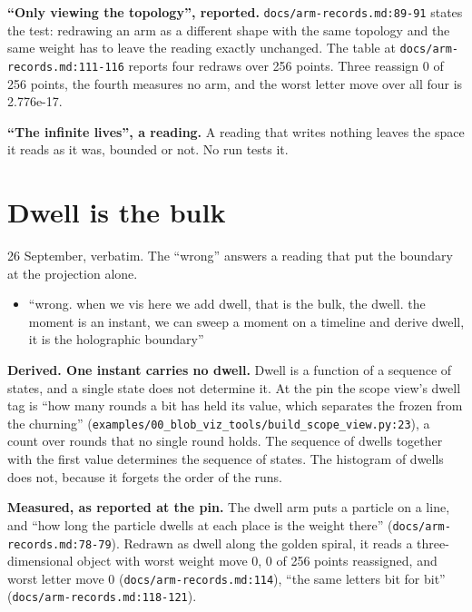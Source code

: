 \textbf{“Only viewing the topology”, reported.} \texttt{docs/\allowbreak{}arm-\allowbreak{}records.\allowbreak{}md:89-\allowbreak{}91} states the test: redrawing an arm as a different shape with the same topology and the same weight has to leave the reading exactly unchanged. The table at \texttt{docs/\allowbreak{}arm-\allowbreak{}records.\allowbreak{}md:111-\allowbreak{}116} reports four redraws over 256 points. Three reassign 0 of 256 points, the fourth measures no arm, and the worst letter move over all four is 2.776e-17.

\textbf{“The infinite lives”, a reading.} A reading that writes nothing leaves the space it reads as it was, bounded or not. No run tests it.

\section{\texorpdfstring{Dwell is the bulk}{Dwell is the bulk}}

26 September, verbatim. The “wrong” answers a reading that put the boundary at the projection alone.

\begin{itemize}
\item “wrong. when we vis here we add dwell, that is the bulk, the dwell. the moment is an instant, we can sweep a moment on a timeline and derive dwell, it is the holographic boundary”
\end{itemize}

\textbf{Derived. One instant carries no dwell.} Dwell is a function of a sequence of states, and a single state does not determine it. At the pin the scope view's dwell tag is “how many rounds a bit has held its value, which separates the frozen from the churning” (\texttt{examples/\allowbreak{}00\_\allowbreak{}blob\_\allowbreak{}viz\_\allowbreak{}tools/\allowbreak{}build\_\allowbreak{}scope\_\allowbreak{}view.\allowbreak{}py:23}), a count over rounds that no single round holds. The sequence of dwells together with the first value determines the sequence of states. The histogram of dwells does not, because it forgets the order of the runs.

\textbf{Measured, as reported at the pin.} The dwell arm puts a particle on a line, and “how long the particle dwells at each place is the weight there” (\texttt{docs/\allowbreak{}arm-\allowbreak{}records.\allowbreak{}md:78-\allowbreak{}79}). Redrawn as dwell along the golden spiral, it reads a three-dimensional object with worst weight move 0, 0 of 256 points reassigned, and worst letter move 0 (\texttt{docs/\allowbreak{}arm-\allowbreak{}records.\allowbreak{}md:114}), “the same letters bit for bit” (\texttt{docs/\allowbreak{}arm-\allowbreak{}records.\allowbreak{}md:118-\allowbreak{}121}).

